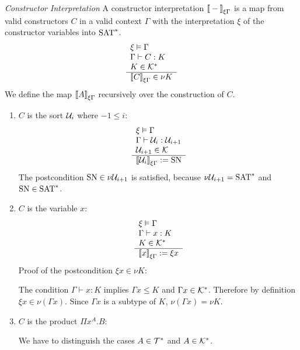\begin{definition}
    \emph{Constructor Interpretation}  A constructor interpretation
    ${{[\![} -{]\!]}}_{\xi \Gamma}$ is a map from valid constructors $C$ in a valid
    context $\Gamma$ with the interpretation $\xi$ of the constructor variables
    into $\text{SAT}^*$.
    $$
    \begin{array}{l} 
        \xi \vDash \Gamma
        \\
        \Gamma \vdash C: K
        \\
        K \in {\cal K}^*
     \\ \hline 
        {{[\![}C{]\!]}}_{\xi \Gamma} \in \nu K
    \end{array}
    $$
    We define the map ${{[\![} A{]\!]}}_{\xi \Gamma}$ recursively over the
    construction of $C$.
    \begin{enumerate}
    \item $C$ is the sort ${\cal U}_i$ where $-1 \le i$:
        $$
            \begin{array}{l} 
                \xi \vDash \Gamma
                \\
                \Gamma \vdash {\cal U}_i: {\cal U}_{i+1}
                \\
                {\cal U}_{i+1} \in {\cal K}
             \\ \hline 
                {{[\![}{\cal U}_i{]\!]}}_{\xi\Gamma} := \text{SN}
            \end{array}
        $$
        The postcondition $\text{SN} \in \nu {\cal U}_{i+1}$ is satisfied, because $\nu
        {\cal U}_{i+1} = \text{SAT}^*$ and $\text{SN} \in \text{SAT}^*$.

    \item $C$ is the variable $x$:
        $$
            \begin{array}{l} 
                \xi \vDash \Gamma
                \\
                \Gamma \vdash x: K
                \\
                K \in {\cal K}^*
             \\ \hline 
                {{[\![}x{]\!]}}_{\xi\Gamma} := \xi x
            \end{array}
        $$
        Proof of the postcondition $\xi x \in \nu K$:

        The condition $\Gamma \vdash x:K$ implies $\Gamma x \le K$ and $\Gamma x
        \in {\cal K}^*$. Therefore by definition $\xi x \in \nu (\Gamma x)$.
        Since $\Gamma x$ is a subtype of $K$, $\nu (\Gamma x) = \nu K$.

    \item $C$ is the product $\Pi x^A. B$:

        We have to distinguish the cases $A \in {\cal T}^*$ and $A \in {\cal K}^*$.


\end{enumerate}
\end{definition}

